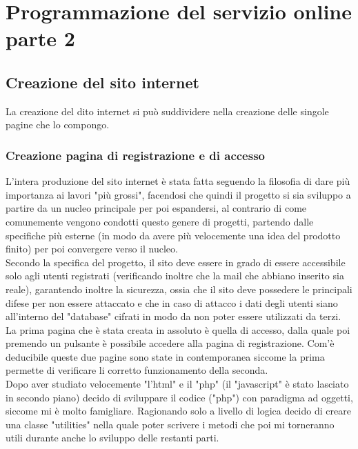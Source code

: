 \chapter{Programmazione del servizio online parte 2}\label{cap:Programmazione del servizio online parte 2}

\section{Creazione del sito internet}\label{sez:Creazione sito internet}

La creazione del dito internet si può suddividere nella creazione delle singole pagine che lo compongo.

\subsection{Creazione pagina di registrazione e di accesso}
L'intera produzione del sito internet è stata fatta seguendo la filosofia di dare più importanza ai lavori "più grossi", facendosi che quindi il progetto si sia sviluppo a partire da un nucleo principale per poi espandersi, al contrario di  come comunemente vengono condotti questo genere di progetti, partendo dalle specifiche più esterne (in modo da avere più velocemente una idea del prodotto finito) per poi convergere verso il nucleo.\\
Secondo la specifica del progetto, il sito deve essere in grado di essere accessibile solo agli utenti registrati (verificando inoltre che la mail che abbiano inserito sia reale), garantendo inoltre la sicurezza, ossia che il sito deve possedere le principali difese per non essere attaccato e che in caso di attacco i dati degli utenti siano all'interno del "database" cifrati in modo da non poter essere utilizzati da terzi.\\
La prima pagina che è stata creata in assoluto è quella di accesso, dalla quale poi premendo un  pulsante è possibile accedere alla pagina di registrazione. Com'è deducibile queste due pagine sono state in contemporanea siccome la prima permette di verificare li corretto funzionamento della seconda.\\

Dopo aver studiato velocemente "l'html" e il "php" (il "javascript" è stato lasciato in secondo piano) decido di sviluppare il codice ("php") con paradigma ad oggetti, siccome mi è molto famigliare. Ragionando solo a livello di logica decido di creare una classe "utilities" nella quale poter scrivere i metodi che poi mi torneranno utili durante anche lo sviluppo delle restanti parti.\\

